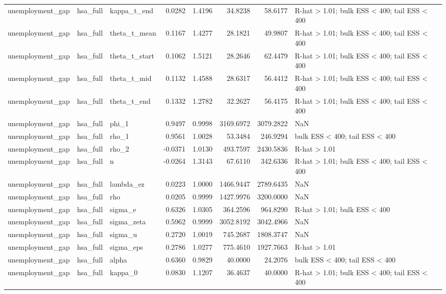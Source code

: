 \begin{tabular}{lllrrrrl}
unemployment\_gap & hsa\_full & kappa\_t\_end & 0.0282 & 1.4196 & 34.8238 & 58.6177 & R-hat > 1.01; bulk ESS < 400; tail ESS < 400 \\
unemployment\_gap & hsa\_full & theta\_t\_mean & 0.1167 & 1.4277 & 28.1821 & 49.9807 & R-hat > 1.01; bulk ESS < 400; tail ESS < 400 \\
unemployment\_gap & hsa\_full & theta\_t\_start & 0.1062 & 1.5121 & 28.2646 & 62.4479 & R-hat > 1.01; bulk ESS < 400; tail ESS < 400 \\
unemployment\_gap & hsa\_full & theta\_t\_mid & 0.1132 & 1.4588 & 28.6317 & 56.4412 & R-hat > 1.01; bulk ESS < 400; tail ESS < 400 \\
unemployment\_gap & hsa\_full & theta\_t\_end & 0.1332 & 1.2782 & 32.2627 & 56.4175 & R-hat > 1.01; bulk ESS < 400; tail ESS < 400 \\
unemployment\_gap & hsa\_full & phi\_1 & 0.9497 & 0.9998 & 3169.6972 & 3079.2822 & NaN \\
unemployment\_gap & hsa\_full & rho\_1 & 0.9561 & 1.0028 & 53.3484 & 246.9294 & bulk ESS < 400; tail ESS < 400 \\
unemployment\_gap & hsa\_full & rho\_2 & -0.0371 & 1.0130 & 493.7597 & 2430.5836 & R-hat > 1.01 \\
unemployment\_gap & hsa\_full & n & -0.0264 & 1.3143 & 67.6110 & 342.6336 & R-hat > 1.01; bulk ESS < 400; tail ESS < 400 \\
unemployment\_gap & hsa\_full & lambda\_ez & 0.0223 & 1.0000 & 1466.9447 & 2789.6435 & NaN \\
unemployment\_gap & hsa\_full & rho & 0.0205 & 0.9999 & 1427.9976 & 3200.0000 & NaN \\
unemployment\_gap & hsa\_full & sigma\_e & 0.6326 & 1.0305 & 364.2596 & 964.8290 & R-hat > 1.01; bulk ESS < 400 \\
unemployment\_gap & hsa\_full & sigma\_zeta & 0.5962 & 0.9999 & 3052.8192 & 3042.4966 & NaN \\
unemployment\_gap & hsa\_full & sigma\_u & 0.2720 & 1.0019 & 745.2687 & 1808.3747 & NaN \\
unemployment\_gap & hsa\_full & sigma\_eps & 0.2786 & 1.0277 & 775.4610 & 1927.7663 & R-hat > 1.01 \\
unemployment\_gap & hsa\_full & alpha & 0.6360 & 0.9829 & 40.0000 & 24.2076 & bulk ESS < 400; tail ESS < 400 \\
unemployment\_gap & hsa\_full & kappa\_0 & 0.0830 & 1.1207 & 36.4637 & 40.0000 & R-hat > 1.01; bulk ESS < 400; tail ESS < 400 \\

\end{tabular}
